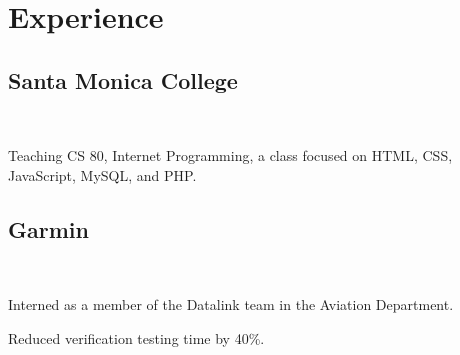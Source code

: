 \documentclass[letterpaper]{deedy-resume} %
\begin{document}
\begin{minipage}[t]{0.66\textwidth}

\sectionspace %


\section{Experience}

\subsection{Santa Monica College}
 \hfill {} \\
\smallsectionspace
\vspace{\topsep} %
\begin{tightitemize}
\item Teaching CS 80, Internet Programming, a class focused on HTML, CSS, JavaScript, MySQL, and PHP.
\end{tightitemize}

\sectionspace %


\subsection{Garmin}
 \hfill {} \\
\begin{tightitemize}
\item Interned as a member of the Datalink team in the Aviation Department. 
\item Reduced verification testing time by 40\%.
\end{tightitemize}


\end{minipage}
\end{document}
